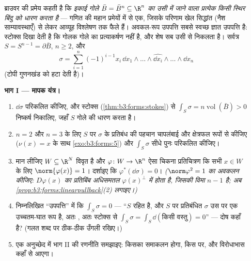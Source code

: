 \begin{problem}[{सप्ताहांत समस्या --- कोई प्रत्याकर्षण नहीं, कोई
पलायन नहीं}]\label{pb:b3:forms:1}
ब्राउवर की प्रमेय कहती है कि \emph{ इकाई गोले $\bar B = \bar B^n \subseteq \R^n$ का उसी
में जाने वाला प्रत्येक  किसी स्थिर बिंदु को धारण
करता है} --- गणित की महान प्रमेयों में से एक, जिसके परिणाम खेल
सिद्धांत (नैश साम्यावस्थाएँ) से लेकर आव्यूह विश्लेषण तक फैले हैं।
अवकल-रूप उपपत्ति सबसे स्वच्छ ज्ञात उपपत्ति है: स्टोक्स दिखा देती
है कि गोलक गोले का प्रत्याकर्षण नहीं है, और शेष सब उसी से निकलता
है। सर्वत्र $S = S^{n-1} = \partial\bar B$, $n \geq 2$, और
\[
\sigma = \sum_{i=1}^n(-1)^{i-1}x_i\,
\dd x_1\wedge\dots\wedge\widehat{\dd x_i}\wedge\dots\wedge
\dd x_n
\]
(टोपी गुणनखंड को हटा देती है)।

\medskip
\noindent\textbf{भाग I --- मापक यंत्र।}
\begin{enumerate}
  \item $\dd\sigma$ परिकलित कीजिए, और स्टोक्स (\cref{thm:b3:forms:stokes}) से $\int_S\sigma =
        n\operatorname{vol}(\bar B) > 0$ निष्कर्ष
        निकालिए, जहाँ $S$ गोले की   धारण करता
        है।
  \item $n = 2$ और $n = 3$ के लिए $S$ पर $\sigma$ के प्रतिबंध की पहचान
        चापलंबाई और क्षेत्रफल रूपों से कीजिए ($\nu(x) = x$ के साथ \cref{exo:b3:forms:5})
        और $\int_S\sigma$ सीधे पुनः परिकलित कीजिए।
  \item मान लीजिए $W \subseteq \R^N$ विवृत है और $\varphi\colon W
        \to \R^n$ ऐसा चिकना प्रतिचित्रण
        कि सभी $x \in W$ के लिए $\norm{\varphi(x)} = 1$। दर्शाइए कि $\varphi^*(\dd\sigma) = 0$।
        \emph{($\norm\varphi^2 = 1$ का अवकलन कीजिए: $D\varphi(x)$ का प्रतिबिंब अधिसमतल
        $\varphi(x)^\perp$ में होता है, जिसकी विमा $n - 1$ है; अब \cref{prop:b3:forms:linearpullback}(2)
        लगाइए।)}
  \item निम्नलिखित ``उपपत्ति'' में कि $\int_S\sigma = 0$ --- ``$S$ 
        रहित  है, और $S$ पर प्रतिबंधित $\sigma$ उस पर एक
        उच्चतम-घात रूप है, अतः , अतः स्टोक्स से $\int_S\sigma =
        \int_S\dd(\text{किसी वस्तु}) = 0$'' ---
        दोष कहाँ है? (गलत शब्द पर ठीक-ठीक उँगली रखिए।)
  \item एक अनुच्छेद में भाग II की रणनीति समझाइए: किसका समाकलन
        होगा, किस पर, और विरोधाभास कहाँ से आएगा।
\end{enumerate}


\end{problem}
